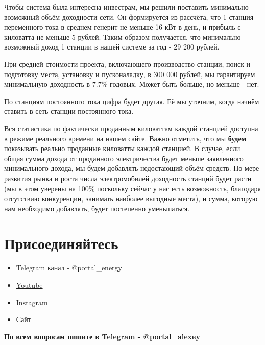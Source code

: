 \documentclass[a4paper,12pt]{report}
\begin{document}
Чтобы система была интересна инвестрам, мы решили поставить минимально возможный объём доходности сети. Он формируется из рассчёта, что 1 станция переменного тока в среднем генерит не меньше 16 кВт в день, и прибыль с киловатта не меньше 5 рублей. Таким образом получается, что минимально возможный доход 1 станции в нашей системе за год - 29 200 рублей. 

При средней стоимости проекта, включающего производство станции, поиск и подготовку места, установку и пусконаладку, в 300 000 рублей, мы гарантируем минимальную доходность в 7.7\% годовых. Может быть больше, но меньше - нет.


По станциям постоянного тока цифра будет другая. Её мы уточним, когда начнём ставить в сеть станции постоянного тока.


Вся статистика по фактически проданным киловаттам каждой станцией доступна в режиме реального времени на нашем сайте. Важно отметить, что мы \textbf{будем} показывать реально проданные киловатты каждой станцией. В случае, если общая сумма дохода от проданного электричества будет меньше заявленного минимального дохода, мы будем добавлять недостающий объём средств. По мере развития рынка и роста числа электромобилей доходность станций будет расти (мы в этом уверены на 100\% поскольку сейчас у нас есть возможность, благодаря отсутствию конкуренции, занимать наиболее выгодные места), и сумма, которую нам необходимо добавлять, будет постепенно уменьшаться. 

\section{Присоединяйтесь}

\begin{itemize}
	\item Telegram канал - @portal\_energy
	\item \href{https://www.youtube.com/channel/UCtPxyCkz73i78F9HChlO61w}{Youtube}
	\item \href{https://www.instagram.com/petr_roadrunner/}{Instagram}
	\item \href{https://poe.portalenergy.tech}{Сайт}
\end{itemize}

\textbf{По всем вопросам пишите в Telegram - @portal\_alexey}
\end{document}
